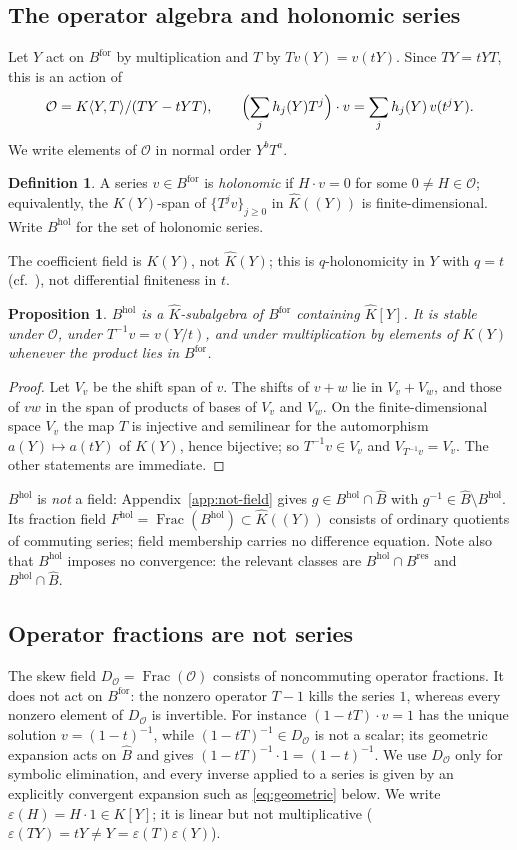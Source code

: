 \documentclass[11pt,a4paper]{article}
\newcommand{\Op}{\mathcal O}
\newcommand{\Bhat}{\widehat B}
\newcommand{\Bres}{B^{\mathrm{res}}}
\newcommand{\Bfor}{B^{\mathrm{for}}}
\newcommand{\Bhol}{B^{\mathrm{hol}}}
\newcommand{\Fhol}{F^{\mathrm{hol}}}
\newcommand{\Dop}{D_{\Op}}
\newcommand{\Khat}{\widehat K}
\newcommand{\eps}{\varepsilon}
\theoremstyle{plain}
\newtheorem{proposition}[theorem]{Proposition}
\theoremstyle{definition}
\newtheorem{definition}[theorem]{Definition}
\theoremstyle{remark}
\begin{document}
\subsection{The operator algebra and holonomic series}
Let $Y$ act on $\Bfor$ by multiplication and $T$ by $Tv(Y)=v(tY)$. Since
$TY=tYT$, this is an action of
\[
  \Op=K\langle Y,T\rangle/(TY-tYT),\qquad
  \Bigl(\sum_j h_j(Y)T^j\Bigr)\cdot v=\sum_j h_j(Y)\,v(t^jY).
\]
We write elements of $\Op$ in normal order $Y^bT^a$.

\begin{definition}
A series $v\in\Bfor$ is \emph{holonomic} if $H\cdot v=0$ for some
$0\ne H\in\Op$; equivalently, the $K(Y)$-span of $\{T^j v\}_{j\ge0}$ in
$\Khat((Y))$ is finite-dimensional. Write $\Bhol$ for the set of holonomic
series.
\end{definition}

The coefficient field is $K(Y)$, not $\Khat(Y)$; this is $q$-holonomicity in
$Y$ with $q=t$ (cf.~\cite{GL}), not differential finiteness in $t$.

\begin{proposition}\label{prop:closure}
$\Bhol$ is a $\Khat$-subalgebra of $\Bfor$ containing $\Khat[Y]$. It is stable
under $\Op$, under $T^{-1}v=v(Y/t)$, and under multiplication by elements of
$K(Y)$ whenever the product lies in $\Bfor$.
\end{proposition}
\begin{proof}
Let $V_v$ be the shift span of $v$. The shifts of $v+w$ lie in $V_v+V_w$, and
those of $vw$ in the span of products of bases of $V_v$ and $V_w$. On the
finite-dimensional space $V_v$ the map $T$ is injective and semilinear for the
automorphism $a(Y)\mapsto a(tY)$ of $K(Y)$, hence bijective; so $T^{-1}v\in V_v$
and $V_{T^{-1}v}=V_v$. The other statements are immediate.
\end{proof}

$\Bhol$ is \emph{not} a field: Appendix~\ref{app:not-field} gives
$g\in\Bhol\cap\Bhat$ with $g^{-1}\in\Bhat\setminus\Bhol$. Its fraction field
$\Fhol=\operatorname{Frac}(\Bhol)\subset\Khat((Y))$ consists of ordinary
quotients of commuting series; field membership carries no difference equation.
Note also that $\Bhol$ imposes no convergence: the relevant classes are
$\Bhol\cap\Bres$ and $\Bhol\cap\Bhat$.

\subsection{Operator fractions are not series}\label{sec:op-fractions}
The skew field $\Dop=\operatorname{Frac}(\Op)$ consists of noncommuting
operator fractions. It does not act on $\Bfor$: the nonzero operator $T-1$
kills the series $1$, whereas every nonzero element of $\Dop$ is invertible.
For instance $(1-tT)\cdot v=1$ has the unique solution
$v=(1-t)^{-1}$, while $(1-tT)^{-1}\in\Dop$ is not a scalar; its geometric
expansion acts on $\Bhat$ and gives $(1-tT)^{-1}\cdot1=(1-t)^{-1}$.
We use $\Dop$ only for symbolic elimination, and every inverse applied to a
series is given by an explicitly convergent expansion such as
\eqref{eq:geometric} below. We write $\eps(H)=H\cdot1\in K[Y]$; it is linear
but not multiplicative ($\eps(TY)=tY\ne Y=\eps(T)\eps(Y)$).
\end{document}
